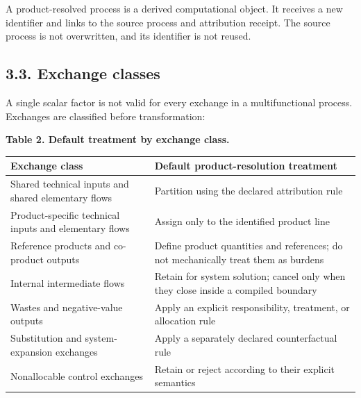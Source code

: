 \documentclass[
  10pt,
  a4paper,
  DIV=11,
  numbers=noendperiod]{scrartcl}
\newcounter{none} %
\begin{document}
A product-resolved process is a derived computational object. It
receives a new identifier and links to the source process and
attribution receipt. The source process is not overwritten, and its
identifier is not reused.

\subsection{3.3. Exchange classes}\label{exchange-classes}

A single scalar factor is not valid for every exchange in a
multifunctional process. Exchanges are classified before transformation:

\textbf{Table 2. Default treatment by exchange class.}

{\def\LTcaptype{none} %
\begin{longtable}[]{@{}
  >{\raggedright\arraybackslash}p{}
  >{\raggedright\arraybackslash}p{}@{}}
\toprule\noalign{}
\begin{minipage}[b]{\linewidth}\raggedright
Exchange class
\end{minipage} & \begin{minipage}[b]{\linewidth}\raggedright
Default product-resolution treatment
\end{minipage} \\
\midrule\noalign{}
\endhead
\bottomrule\noalign{}
\endlastfoot
Shared technical inputs and shared elementary flows & Partition using
the declared attribution rule \\
Product-specific technical inputs and elementary flows & Assign only to
the identified product line \\
Reference products and co-product outputs & Define product quantities
and references; do not mechanically treat them as burdens \\
Internal intermediate flows & Retain for system solution; cancel only
when they close inside a compiled boundary \\
Wastes and negative-value outputs & Apply an explicit responsibility,
treatment, or allocation rule \\
Substitution and system-expansion exchanges & Apply a separately
declared counterfactual rule \\
Nonallocable control exchanges & Retain or reject according to their
explicit semantics \\
\end{longtable}
}
\end{document}
